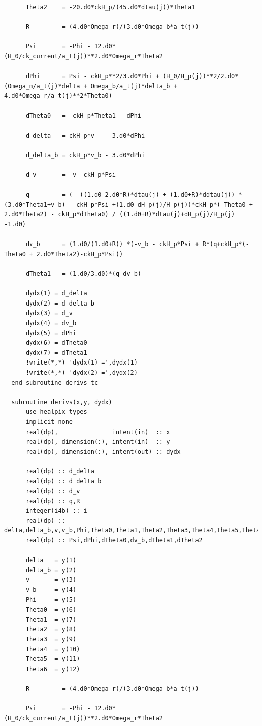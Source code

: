 \documentclass[a4paper]{report}
\begin{document}
\begin{verbatim}
      Theta2    = -20.d0*ckH_p/(45.d0*dtau(j))*Theta1

      R         = (4.d0*Omega_r)/(3.d0*Omega_b*a_t(j))

      Psi       = -Phi - 12.d0*(H_0/ck_current/a_t(j))**2.d0*Omega_r*Theta2

      dPhi      = Psi - ckH_p**2/3.d0*Phi + (H_0/H_p(j))**2/2.d0*(Omega_m/a_t(j)*delta + Omega_b/a_t(j)*delta_b + 4.d0*Omega_r/a_t(j)**2*Theta0)

      dTheta0   = -ckH_p*Theta1 - dPhi

      d_delta   = ckH_p*v   - 3.d0*dPhi

      d_delta_b = ckH_p*v_b - 3.d0*dPhi

      d_v       = -v -ckH_p*Psi

      q         = ( -((1.d0-2.d0*R)*dtau(j) + (1.d0+R)*ddtau(j)) *(3.d0*Theta1+v_b) - ckH_p*Psi +(1.d0-dH_p(j)/H_p(j))*ckH_p*(-Theta0 + 2.d0*Theta2) - ckH_p*dTheta0) / ((1.d0+R)*dtau(j)+dH_p(j)/H_p(j) -1.d0)

      dv_b      = (1.d0/(1.d0+R)) *(-v_b - ckH_p*Psi + R*(q+ckH_p*(-Theta0 + 2.d0*Theta2)-ckH_p*Psi))

      dTheta1   = (1.d0/3.d0)*(q-dv_b)

      dydx(1) = d_delta
      dydx(2) = d_delta_b
      dydx(3) = d_v
      dydx(4) = dv_b
      dydx(5) = dPhi
      dydx(6) = dTheta0
      dydx(7) = dTheta1
      !write(*,*) 'dydx(1) =',dydx(1)
      !write(*,*) 'dydx(2) =',dydx(2)
  end subroutine derivs_tc

  subroutine derivs(x,y, dydx) 
      use healpix_types
      implicit none
      real(dp),               intent(in)  :: x
      real(dp), dimension(:), intent(in)  :: y
      real(dp), dimension(:), intent(out) :: dydx

      real(dp) :: d_delta
      real(dp) :: d_delta_b
      real(dp) :: d_v
      real(dp) :: q,R
      integer(i4b) :: i
      real(dp) :: delta,delta_b,v,v_b,Phi,Theta0,Theta1,Theta2,Theta3,Theta4,Theta5,Theta6
      real(dp) :: Psi,dPhi,dTheta0,dv_b,dTheta1,dTheta2

      delta   = y(1)
      delta_b = y(2)
      v       = y(3)
      v_b     = y(4)
      Phi     = y(5)
      Theta0  = y(6)
      Theta1  = y(7)
      Theta2  = y(8)
      Theta3  = y(9)
      Theta4  = y(10)
      Theta5  = y(11)
      Theta6  = y(12)

      R         = (4.d0*Omega_r)/(3.d0*Omega_b*a_t(j))

      Psi       = -Phi - 12.d0*(H_0/ck_current/a_t(j))**2.d0*Omega_r*Theta2


\end{verbatim}
\end{document}
